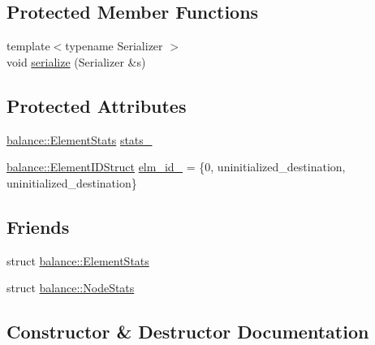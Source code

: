 \subsection*{Protected Member Functions}
\begin{DoxyCompactItemize}
\item 
{\footnotesize template$<$typename Serializer $>$ }\\void \hyperlink{structvt_1_1vrt_1_1collection_1_1_migratable_a2ff02da700394ecd37f3fbb6f0724a3e}{serialize} (Serializer \&s)
\end{DoxyCompactItemize}
\subsection*{Protected Attributes}
\begin{DoxyCompactItemize}
\item 
\hyperlink{structvt_1_1vrt_1_1collection_1_1balance_1_1_element_stats}{balance\+::\+Element\+Stats} \hyperlink{structvt_1_1vrt_1_1collection_1_1_migratable_a3572db662dd07c4f00b32e6198ef8da9}{stats\+\_\+}
\item 
\hyperlink{structvt_1_1vrt_1_1collection_1_1balance_1_1_element_i_d_struct}{balance\+::\+Element\+I\+D\+Struct} \hyperlink{structvt_1_1vrt_1_1collection_1_1_migratable_aef4c21c94ff642a460c5686ec4944c51}{elm\+\_\+id\+\_\+} = \{0, uninitialized\+\_\+destination, uninitialized\+\_\+destination\}
\end{DoxyCompactItemize}
\subsection*{Friends}
\begin{DoxyCompactItemize}
\item 
struct \hyperlink{structvt_1_1vrt_1_1collection_1_1_migratable_abdce9596911e092af07635bdcc13acd1}{balance\+::\+Element\+Stats}
\item 
struct \hyperlink{structvt_1_1vrt_1_1collection_1_1_migratable_aeb7bfed9b6cf9f03ff3a2d6798de8dd0}{balance\+::\+Node\+Stats}
\end{DoxyCompactItemize}


\subsection{Constructor \& Destructor Documentation}
\mbox{\label{structvt_1_1vrt_1_1collection_1_1_migratable_a598f0bb3acfb602d437eab3625b105c5}} 
